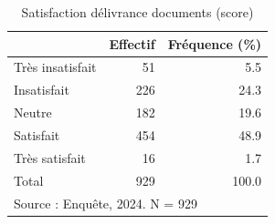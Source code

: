 \begin{table}[htbp]\centering
\def\sym#1{\ifmmode^{#1}\else\(^{#1}\)\fi}
\caption{Satisfaction délivrance documents (score)}
\begin{tabular}{l*{2}{r}}
\toprule
            &    Effectif&Fréquence (\%)\\
\midrule
Très insatisfait&          51&         5.5\\
Insatisfait &         226&        24.3\\
Neutre      &         182&        19.6\\
Satisfait   &         454&        48.9\\
Très satisfait&          16&         1.7\\
Total       &         929&       100.0\\
\bottomrule
\multicolumn{3}{l}{\footnotesize Source : Enquête, 2024. N = 929}\\
\end{tabular}
\end{table}
